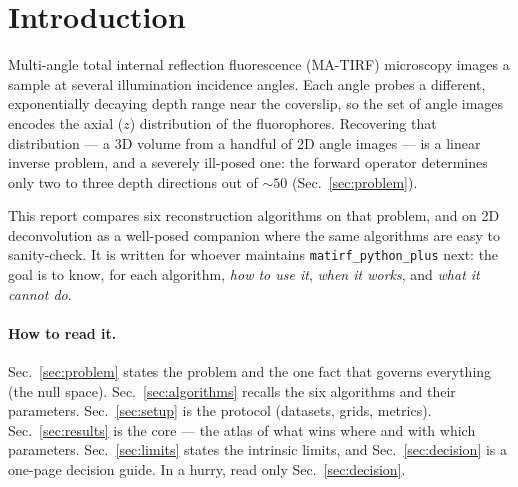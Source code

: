 \section{Introduction}
\label{sec:intro}

Multi-angle total internal reflection fluorescence (MA-TIRF) microscopy images a sample at
several illumination incidence angles. Each angle probes a different, exponentially decaying
depth range near the coverslip, so the set of angle images encodes the axial ($z$) distribution
of the fluorophores. Recovering that distribution --- a 3D volume from a handful of 2D angle
images --- is a linear inverse problem, and a severely ill-posed one: the forward operator
determines only two to three depth directions out of ${\sim}50$ (Sec.~\ref{sec:problem}).

This report compares six reconstruction algorithms on that problem, and on 2D deconvolution as
a well-posed companion where the same algorithms are easy to sanity-check. It is written for
whoever maintains \texttt{matirf\_python\_plus} next: the goal is to know, for each algorithm,
\emph{how to use it}, \emph{when it works}, and \emph{what it cannot do}.

\paragraph{How to read it.}
Sec.~\ref{sec:problem} states the problem and the one fact that governs everything (the null
space). Sec.~\ref{sec:algorithms} recalls the six algorithms and their parameters.
Sec.~\ref{sec:setup} is the protocol (datasets, grids, metrics). Sec.~\ref{sec:results} is the
core --- the atlas of what wins where and with which parameters. Sec.~\ref{sec:limits} states
the intrinsic limits, and Sec.~\ref{sec:decision} is a one-page decision guide. In a hurry, read
only Sec.~\ref{sec:decision}.
